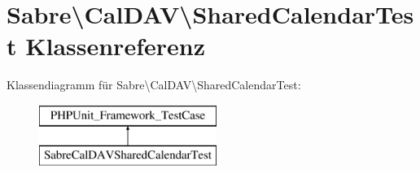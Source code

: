 \hypertarget{class_sabre_1_1_cal_d_a_v_1_1_shared_calendar_test}{}\section{Sabre\textbackslash{}Cal\+D\+AV\textbackslash{}Shared\+Calendar\+Test Klassenreferenz}
\label{class_sabre_1_1_cal_d_a_v_1_1_shared_calendar_test}
Klassendiagramm für Sabre\textbackslash{}Cal\+D\+AV\textbackslash{}Shared\+Calendar\+Test\+:\begin{figure}[H]
\begin{center}
\leavevmode
\includegraphics[height=2.000000cm]{class_sabre_1_1_cal_d_a_v_1_1_shared_calendar_test}
\end{center}
\end{figure}
